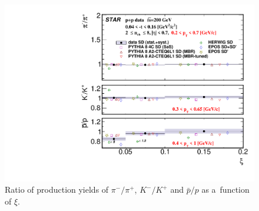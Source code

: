 \begin{figure}[h!]
	\centering
	\includegraphics[width=.99\textwidth,page=1]{chapters/chrgSTAR/img/results/ratio_xi.pdf}
	\caption{Ratio of production yields of $\pi^-/\pi^+$, $K^-/K^+$ and $\bar{p}/p$ as a~function of $\xi$. }
	\label{fig:results_mean_ratio_star}
	
\end{figure}